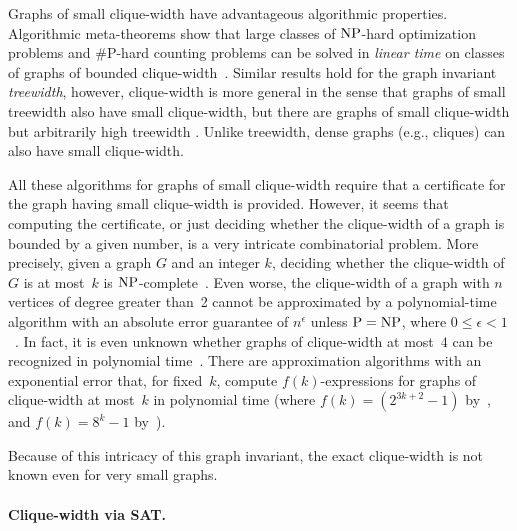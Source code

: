 \documentclass[10pt,usletter]{article}
\theoremstyle{remark}
\renewcommand{\P}{\text{\normalfont P}}
\newcommand{\NP}{\text{\normalfont NP}}
\newcommand{\hy}{\hbox{-}\nobreak\hskip0pt}
\begin{document}
Graphs of small clique-width have  advantageous algorithmic properties. 
Algorithmic meta-theorems show that large classes of
$\NP$-hard optimization problems and \#P-hard counting problems can be
solved in \emph{linear time} on classes of graphs of bounded
clique-width~\cite{CourcelleMakowskyRotics00,CourcelleMakowskyRotics01}. Similar
results hold for the graph invariant \emph{treewidth}, however,
clique-width is more general in the sense that graphs of small
treewidth also have small clique-width, but there are graphs of small
clique-width but arbitrarily high treewidth
\cite{CourcelleOlariu00,CornelRotics05}. Unlike treewidth, dense
graphs (e.g., cliques) can also have small clique-width.

All these algorithms for graphs of small clique-width require that a
certificate for the graph having small clique-width is provided.
However, it seems that computing the certificate, or just deciding
whether the clique-width of a graph is bounded by a given number, is a
very intricate combinatorial problem.  More precisely, given a graph
$G$ and an integer $k$, deciding whether the clique-width of $G$ is at
most~$k$ is $\NP$\hy complete~\cite{FellowsRosamondRoticsSzeider09}.
Even worse, the clique-width of a graph with $n$ vertices of degree
greater than~2 cannot be approximated by a polynomial-time algorithm
with an absolute error guarantee of $n^\epsilon$ unless $\P=\NP$,
where $0\leq \epsilon < 1$~\cite{FellowsRosamondRoticsSzeider09}.  In
fact, it is even unknown whether graphs of clique-width at most~$4$
can be recognized in polynomial time~\cite{CornelEtal12}.  There are
approximation algorithms with an exponential error that, for
fixed~$k$, compute $f(k)$\hy expressions for graphs of clique-width at
most~$k$ in polynomial time (where $f(k)=(2^{3k+2}-1)$ by~\cite{OumSeymour06},
and $f(k)=8^k-1$ by~\cite{Oum08}).

Because of this intricacy of this graph invariant, the exact
clique-width is not known even for very small graphs.



\paragraph{Clique-width via SAT.}
\end{document}
